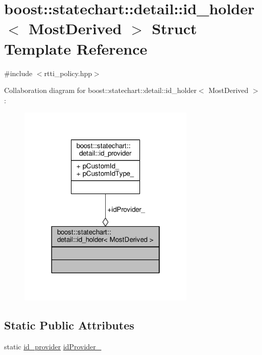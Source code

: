 \hypertarget{structboost_1_1statechart_1_1detail_1_1id__holder}{}\section{boost\+:\+:statechart\+:\+:detail\+:\+:id\+\_\+holder$<$ Most\+Derived $>$ Struct Template Reference}
\label{structboost_1_1statechart_1_1detail_1_1id__holder}


{\ttfamily \#include $<$rtti\+\_\+policy.\+hpp$>$}



Collaboration diagram for boost\+:\+:statechart\+:\+:detail\+:\+:id\+\_\+holder$<$ Most\+Derived $>$\+:
\nopagebreak
\begin{figure}[H]
\begin{center}
\leavevmode
\includegraphics[width=238pt]{structboost_1_1statechart_1_1detail_1_1id__holder__coll__graph}
\end{center}
\end{figure}
\subsection*{Static Public Attributes}
\begin{DoxyCompactItemize}
\item 
static \mbox{\hyperlink{structboost_1_1statechart_1_1detail_1_1id__provider}{id\+\_\+provider}} \mbox{\hyperlink{structboost_1_1statechart_1_1detail_1_1id__holder_a6d264be4c76a924c9f8d281edf791664}{id\+Provider\+\_\+}}
\end{DoxyCompactItemize}


